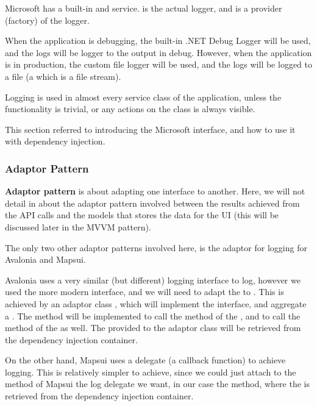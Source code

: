 Microsoft has a built-in  and  service.  is the actual logger, and  is a provider (factory) of the logger.

When the application is debugging, the built-in .NET Debug Logger will be used, and the logs will be logger to the output in debug. However, when the application is in production, the custom file logger will be used, and the logs will be logged to a file (a  which is a file stream).

Logging is used in almost every service class of the application, unless the functionality is trivial, or any actions on the class is always visible.

This section referred to \autocite{dotnet-tutorial-logging} introducing the Microsoft  interface, and how to use it with dependency injection.

\subsubsection{Adaptor Pattern}

\textbf{Adaptor pattern} is about adapting one interface to another. Here, we will not detail in about the adaptor pattern involved between the results achieved from the API calls and the models that stores the data for the UI (this will be discussed later in the MVVM pattern).

The only two other adaptor patterns involved here, is the adaptor for logging for Avalonia and Mapsui.

Avalonia uses a very similar (but different) logging interface  to log, however we used the more modern  interface, and we will need to adapt the  to . This is achieved by an adaptor class , which will implement the  interface, and aggregate a . The  method will be implemented to call the  method of the , and  to call the  method of the  as well. The  provided to the adaptor class will be retrieved from the dependency injection container.

On the other hand, Mapsui uses a delegate (a callback function) to achieve logging. This is relatively simpler to achieve, since we could just attach to the  method of Mapsui the log delegate we want, in our case the  method, where the  is retrieved from the dependency injection container.

